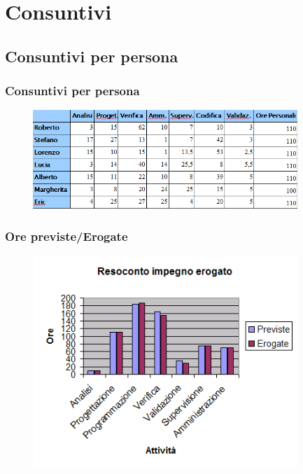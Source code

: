 
\section{Consuntivi}

\subsection*{Consuntivi per persona}

\begin{frame}
\frametitle{Consuntivi per persona}

\begin{figure}
  \includegraphics[width=10cm]{img/OrePersona.png}
\end{figure}

\end{frame}


\begin{frame}
\frametitle{Ore previste/Erogate}

\begin{figure}
  \includegraphics[width=10cm]{img/Impegno_Erogato.png}
\end{figure}

\end{frame}


